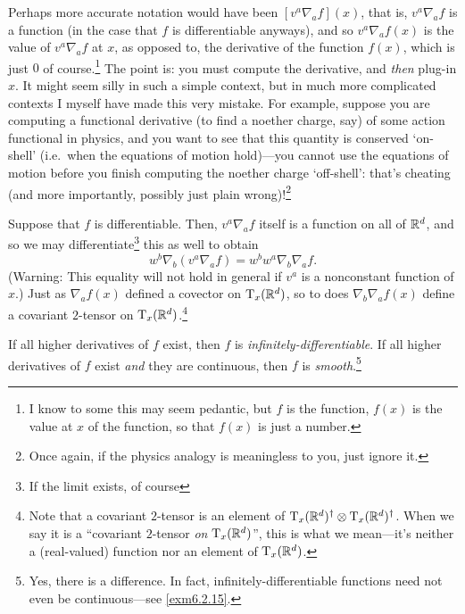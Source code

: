 \begin{dfn}
\begin{savenotes}
\begin{rmk}
Perhaps more accurate notation would have been $[v^a\nabla _af](x)$, that is, $v^a\nabla _af$ is a function (in the case that $f$ is differentiable anyways), and so $v^a\nabla _af(x)$ is the value of $v^a\nabla _af$ at $x$, as opposed to, the derivative of the function $f(x)$, which is just $0$ of course.\footnote{I know to some this may seem pedantic, but $f$ is the function, $f(x)$ is the value at $x$ of the function, so that $f(x)$ is just a number.}  The point is:  you must compute the derivative, and \emph{then} plug-in $x$.  It might seem silly in such a simple context, but in much more complicated contexts I myself have made this very mistake.  For example, suppose you are computing a functional derivative (to find a noether charge, say) of some action functional in physics, and you want to see that this quantity is conserved `on-shell' (i.e.~when the equations of motion hold)---you cannot use the equations of motion before you finish computing the noether charge `off-shell':  that's cheating (and more importantly, possibly just plain wrong)!\footnote{Once again, if the physics analogy is meaningless to you, just ignore it.}
\end{rmk}
\begin{rmk}
Suppose that $f$ is differentiable.  Then, $v^a\nabla _af$ itself is a function on all of $\R ^d$, and so we may differentiate\footnote{If the limit exists, of course} this as well to obtain
\begin{equation}
w^b\nabla _b(v^a\nabla _af)=w^bw^a\nabla _b\nabla _af.
\end{equation}
(Warning:  This equality will not hold in general if $v^a$ is a nonconstant function of $x$.)  Just as $\nabla _af(x)$ defined a covector on $\tangent{\R ^d}{x}$, so to does $\nabla _b\nabla _af(x)$ define a covariant $2$-tensor on $\tangent{\R ^d}{x}$.\footnote{Note that a covariant $2$-tensor is an element of $\tangent{\R ^d}{x}^\dagger \otimes \tangent{\R ^d}{x}^\dagger$.  When we say it is a ``covariant $2$-tensor \emph{on} $\tangent{\R ^d}{x}$'', this is what we mean---it's neither a (real-valued) function nor an element of $\tangent{\R ^d}{x}$.}
\end{rmk}
\begin{rmk}
If all higher derivatives of $f$ exist, then $f$ is \emph{infinitely-differentiable}.  If all higher derivatives of $f$ exist \emph{and} they are continuous, then $f$ is \emph{smooth}.\footnote{Yes, there is a difference.  In fact, infinitely-differentiable functions need not even be continuous---see \cref{exm6.2.15}.}
\end{rmk}
\end{savenotes}
\end{dfn}
